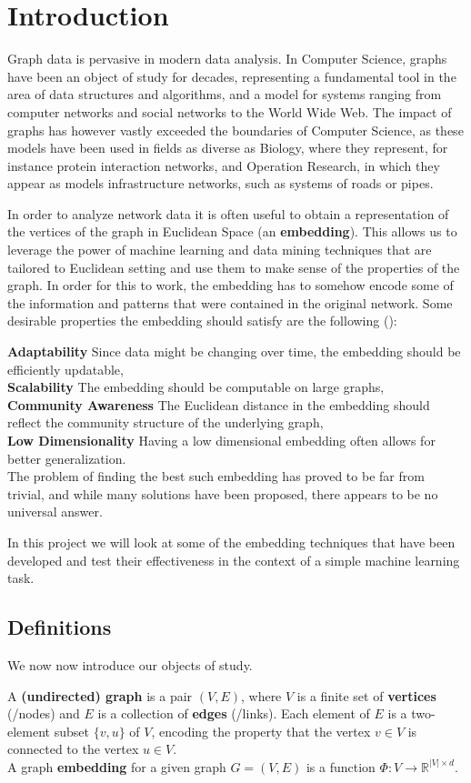 \section{Introduction}
Graph data is pervasive in modern data analysis. In Computer Science, graphs have been an object of study for decades, representing a fundamental tool in the area of data structures and algorithms, and a model for systems ranging from computer networks and social networks to the World Wide Web. The impact of graphs has however vastly exceeded the boundaries of Computer Science, as these models have been used in fields as diverse as Biology, where they represent, for instance protein interaction networks, and Operation Research, in which they appear as models infrastructure networks, such as systems of roads or pipes.

In order to analyze network data it is often useful to obtain a representation of the vertices of the graph in Euclidean Space (an \textbf{embedding}). This allows us to leverage the power of machine learning and data mining techniques that are tailored to Euclidean setting and use them to make sense of the properties of the graph. In order for this to work, the embedding has to somehow encode some of the information and patterns that were contained in the original network. Some desirable properties the embedding should satisfy are the following (\cite{chen2018tutorial}):

\textbf{Adaptability} Since data might be changing over time, the embedding should be efficiently updatable,\\
\textbf{Scalability} The embedding should be computable on large graphs,\\
\textbf{Community Awareness} The Euclidean distance in the embedding should reflect the community structure of the underlying graph,\\
\textbf{Low Dimensionality} Having a low dimensional embedding often allows for better generalization.\\


The problem of finding the best such embedding has proved to be far from trivial, and while many solutions have been proposed, there appears to be no universal answer.

In this project we will look at some of the embedding techniques that have been developed and test their effectiveness in the context of a simple machine learning task.


\subsection{Definitions}
We now now introduce our objects of study.

A \textbf{(undirected) graph} is a pair $(V,E)$, where $V$ is a finite set of \textbf{vertices} (/nodes) and $E$ is a collection of \textbf{edges} (/links). Each element of $E$ is a two-element subset $\{v,u\}$ of $V$, encoding the property that the vertex $v \in V$ is connected to the vertex $u \in V$.\\

A graph \textbf{embedding} for a given graph $G = (V,E)$ is a function $\Phi:V \to \mathbb{R}^{|V| \times d}$.
